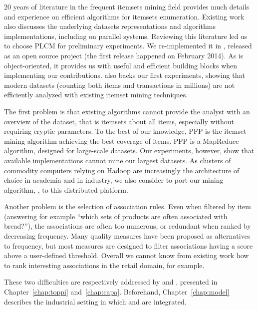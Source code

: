 20 years of literature in the frequent itemsets mining field provides much details and experience
on efficient algorithms for itemsets enumeration.
Existing work also discusses the underlying datasets representations and algorithms implementations,
including on parallel systems.
Reviewing this literature led us to choose PLCM for preliminary experiments.
We re-implemented it in \jlcm,
released as an open source project %
(the first release happened on February 2014).
As \jlcm is object-oriented, it provides us with useful and efficient building blocks
when implementing our contributions.
\jlcm also backs our first experiments,
showing that modern datasets
(counting both items and transactions in millions)
are not efficiently analyzed with existing itemset mining techniques.

The first problem is that existing algorithms cannot provide the analyst with an overview of the dataset,
that is itemsets about all items,
especially without requiring cryptic parameters.
To the best of our knowledge,
PFP is the itemset mining algorithm achieving the best coverage of items.
PFP is a MapReduce algorithm,
designed for large-scale datasets.
Our experiments, however, show that available implementations cannot mine our largest datasets.
As clusters of commodity computers relying on Hadoop are increasingly
the architecture of choice in academia and in industry,
we also consider to port our mining algorithm, \toppi, to this distributed platform.

Another problem is the selection of association rules.
Even when filtered by item (answering for example ``which sets of products are often associated with bread?''),
the associations are often too numerous,
or redundant when ranked by decreasing frequency.
Many quality measures have been proposed as alternatives to frequency,
but most measures are designed to filter associations having a score above a user-defined threshold.
Overall we cannot know from existing work how to rank interesting associations
in the retail domain, for example.

These two difficulties are respectively addressed by \toppi and \capa,
presented in Chapter~\ref{chap:toppi} and~\ref{chap:capa}.
Beforehand, Chapter~\ref{chap:model} describes the industrial setting in which \toppi and \capa are integrated.
